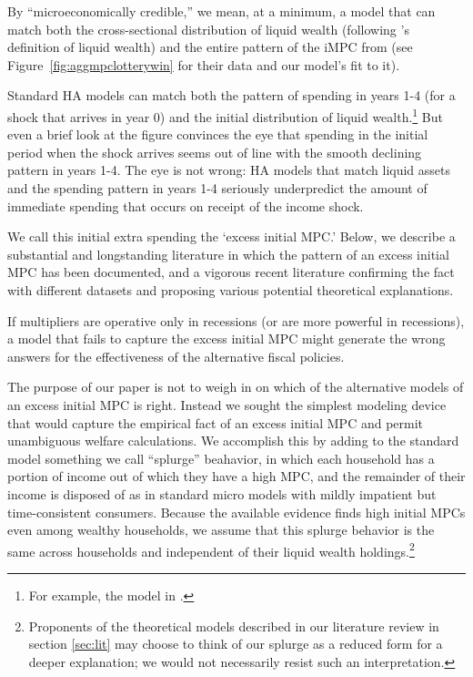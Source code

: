 \documentclass[\econtexRoot/HAFiscal]{subfiles}
\begin{document}
\hypertarget{microeconomically-credible}{}
By ``microeconomically credible,'' we mean, at a minimum, a model that can match both the cross-sectional distribution of liquid wealth (following \cite{kaplan2014model}'s definition of liquid wealth) and the entire pattern of the iMPC from \cite{fagereng_mpc_2021} (see Figure~\ref{fig:aggmpclotterywin} for their data and our model's fit to it).

\hypertarget{excess-initial-mpc}{}
Standard HA models can match both the pattern of spending in years 1-4 (for a shock that arrives in year 0) and the initial distribution of liquid wealth.\footnote{For example, the model in \cite{cstwMPC}.}  But even a brief look at the figure convinces the eye that spending in the initial period when the shock arrives seems out of line with the smooth declining pattern in years 1-4.  The eye is not wrong: HA models that match liquid assets and the spending pattern in years 1-4 seriously underpredict the amount of immediate spending that occurs on receipt of the income shock.

We call this initial extra spending the `excess initial MPC.'  Below, we describe a substantial and longstanding literature in which the pattern of an excess initial MPC has been documented, and a vigorous recent literature confirming the fact with different datasets and proposing various potential theoretical explanations.

If multipliers are operative only in recessions (or are more powerful in recessions), a model that fails to capture the excess initial MPC might generate the wrong answers for the effectiveness of the alternative fiscal policies.

The purpose of our paper is not to weigh in on which of the alternative models of an excess initial MPC is right.  Instead we sought the simplest modeling device that would capture the empirical fact of an excess initial MPC and permit unambiguous welfare calculations.  We accomplish this by adding to the standard model something we call ``splurge'' beahavior, in which each household has a portion of income out of which they have a high MPC, and the remainder of their income is disposed of as in standard micro models with mildly impatient but time-consistent consumers.  Because the available evidence finds high initial MPCs even among wealthy households, we assume that this splurge behavior is the same across households and independent of their liquid wealth holdings.\footnote{Proponents of the theoretical models described in our literature review in section \ref{sec:lit} may choose to think of our splurge as a reduced form for a deeper explanation; we would not necessarily resist such an interpretation.}
\end{document}
